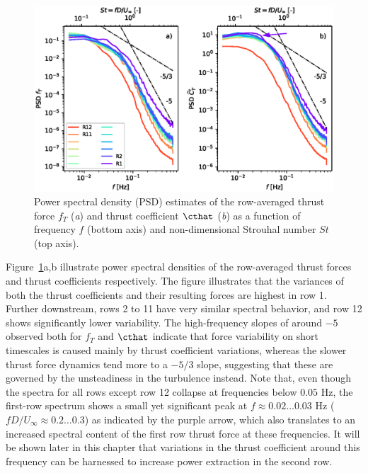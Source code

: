 	\begin{figure}
		\includegraphics[width=\textwidth]{chapters/analysis_induction_control/spectra_thrust_cthat.eps}
		\caption{Power spectral density (PSD) estimates of the row-averaged thrust force $f_T$ (\emph{a}) and thrust coefficient $\cthat$ (\emph{b}) as a function of frequency $f$ (bottom axis) and non-dimensional Strouhal number $St$ (top axis). \label{fig:spectra_thrust_cthat}}
	\end{figure}
	
	Figure~\ref{fig:spectra_thrust_cthat}a,b illustrate power spectral densities of the row-averaged thrust forces and thrust coefficients respectively. The figure illustrates that the variances of both the thrust coefficients and their resulting forces are highest in row 1. Further downstream, rows 2 to 11 have very similar spectral behavior, and row 12 shows significantly lower variability. The high-frequency slopes of around $-5$ observed both for $f_T$ and $\cthat$ indicate that force variability on short timescales is caused mainly by thrust coefficient variations, whereas the slower thrust force dynamics tend more to a $-5/3$ slope, suggesting that these are governed by the unsteadiness in the turbulence instead. Note that, even though the spectra for all rows except row 12 collapse at frequencies below $0.05$ Hz, the first-row spectrum shows a small yet significant peak at $f \approx 0.02 \dots 0.03$ Hz ($f D / U_\infty \approx 0.2 \dots 0.3$) as indicated by the purple arrow, which also translates to an increased spectral content of the first row thrust force at these frequencies. It will be shown later in this chapter that variations in the thrust coefficient around this frequency can be harnessed to increase power extraction in the second row. 

